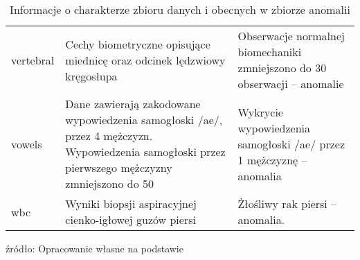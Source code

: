 \begin{table}[h]
\begin{tabularx}{\textwidth}{lXX}
 vertebral &  Cechy biometryczne opisujące miednicę oraz odcinek lędzwiowy kręgosłupa   &            Obserwacje normalnej biomechaniki zmniejszono do 30 obserwacji -- anomalie  \\
    vowels & Dane zawierają zakodowane wypowiedzenia samogłoski {/ae/}, przez 4 mężczyzn. Wypowiedzenia samogłoski przez pierwszego mężczyzny zmniejszono do 50 & Wykrycie wypowiedzenia samogłoski /ae/ przez 1 mężczyznę  -- anomalia         \\
       wbc &   Wyniki biopsji aspiracyjnej cienko-igłowej guzów piersi & Żłośliwy rak piersi -- anomalia.
\bottomrule
\end{tabularx}
    \caption{Informacje o charakterze zbioru danych i obecnych w zbiorze anomalii}
    \footnotesize{źródło: Opracowanie własne na podstawie \cite{ODDS}}
    \label{tab:my_label}
\end{table}
